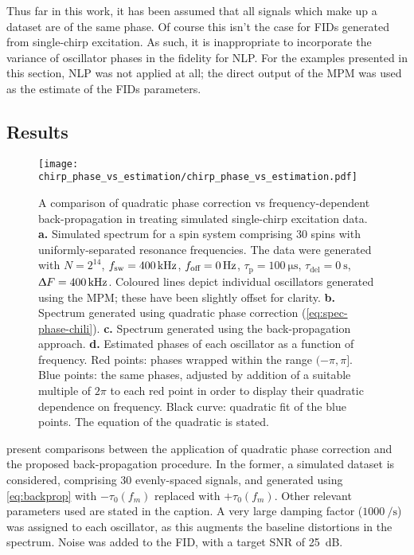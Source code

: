 Thus far in this work, it has been assumed that all signals which make up a
dataset are of the same phase. Of course this isn't the case for \acp{FID}
generated from single-chirp excitation. As such, it is inappropriate to
incorporate the variance of oscillator phases in the fidelity for \ac{NLP}.
For the examples presented in this section, \ac{NLP} was not applied at all;
the direct output of the \ac{MPM} was used as the estimate of the \acp{FID}
parameters.

\subsection{Results}
\begin{figure}
    \centering
    \texttt{[image: chirp\_phase\_vs\_estimation/chirp\_phase\_vs\_estimation.pdf]}
    \caption[
        A comparison of quadratic phase correction vs frequency-dependent
        back-propagation in treating simulated single-chirp excitation data.
    ]
    {
        A comparison of quadratic phase correction vs frequency-dependent
        back-propagation in treating simulated single-chirp excitation data.
        \textbf{a.} Simulated spectrum for a spin system comprising 30 spins
        with uniformly-separated resonance frequencies. The data were generated
        with
        $N=2^{14}$,
        $f_{\mathrm{sw}}=\qty{400}{\kilo\hertz}$,
        $f_{\text{off}}=\qty{0}{\hertz}$,
        $\tau_{\text{p}} = \qty{100}{\micro\second}$,
        $\tau_{\text{del}} = \qty{0}{\second}$,
        $\Updelta F = \qty{400}{\kilo\hertz}$.
        Coloured lines depict individual oscillators generated using the
        \ac{MPM}; these have been slightly offset for clarity.
        \textbf{b.} Spectrum generated using quadratic phase correction
        (\cref{eq:spec-phase-chili}).
        \textbf{c.} Spectrum generated using the back-propagation approach.
        \textbf{d.} Estimated phases of each oscillator as a function of
        frequency. Red points: phases wrapped within the range $(-\pi, \pi]$.
        Blue points: the same phases, adjusted by addition of a suitable multiple
        of $2 \pi$ to each red point in order to display their quadratic
        dependence on frequency.
        Black curve: quadratic fit of the blue points. The equation of the
        quadratic is stated.
    }
    \label{fig:bbqchili-sim}
\end{figure}
 present comparisons
between the application of quadratic phase correction and the proposed
back-propagation procedure. In the former, a simulated
dataset is considered, comprising 30 evenly-spaced signals, and generated using
\cref{eq:backprop} with $-\tau_0(f_m)$ replaced with $+\tau_0(f_m)$. Other
relevant parameters used are stated in the caption.
A very large damping factor ($\qty{1000}{\per\second}$) was assigned to each
oscillator, as this augments the baseline distortions in the spectrum.
Noise was added to the \ac{FID}, with a target \ac{SNR} of
\qty{25}{\deci\bel}.

